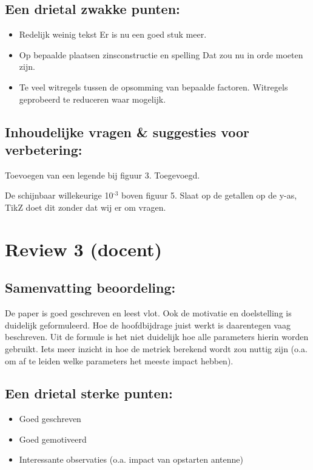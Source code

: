 \documentclass[11pt]{article}
\begin{document}
\subsection{Een drietal zwakke punten:}
\begin{itemize}
\item Redelijk weinig tekst {\color{red} Er is nu een goed stuk meer.}
\item Op bepaalde plaatsen zinsconstructie en spelling {\color{red} Dat zou nu in orde moeten zijn.}
\item Te veel witregels tussen de opsomming van bepaalde factoren. {\color{red} Witregels geprobeerd te reduceren waar mogelijk.}
\end{itemize}

\subsection{Inhoudelijke vragen \& suggesties voor verbetering:}

Toevoegen van een legende bij figuur 3. {\color{red} Toegevoegd.}

De schijnbaar willekeurige 10$^{\text{-3}}$ boven figuur 5. {\color{red} Slaat op de getallen op de y-as, TikZ doet dit zonder dat wij er om vragen.}

\section{Review 3 (docent)}

\subsection{Samenvatting beoordeling:}

De paper is goed geschreven en leest vlot. Ook de motivatie en doelstelling is
duidelijk geformuleerd. Hoe de hoofdbijdrage juist werkt is daarentegen vaag
beschreven. Uit de formule is het niet duidelijk hoe alle parameters hierin
worden gebruikt. Iets meer inzicht in hoe de metriek berekend wordt zou nuttig
zijn (o.a. om af te leiden welke parameters het meeste impact hebben).

\subsection{Een drietal sterke punten:}
\begin{itemize}
\item Goed geschreven
\item Goed gemotiveerd
\item Interessante observaties (o.a. impact van opstarten antenne)
\end{itemize}
\end{document}
